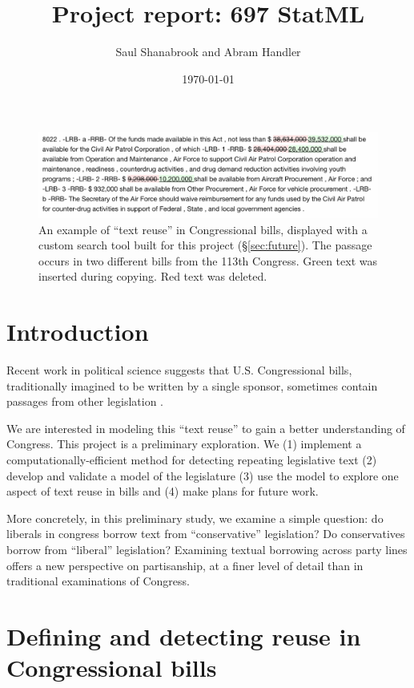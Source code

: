\documentclass{article}
\title{Project report: 697 StatML}
\author{Saul Shanabrook and Abram Handler}
\date{\today}
\begin{document}
\maketitle

\begin{figure}[h]
\begin{mdframed}
\includegraphics[width=13cm]{reuse3.png}
\centering
\caption{An example of ``text reuse'' in Congressional bills, displayed with a custom search tool built for this project (\S\ref{sec:future}). The passage occurs in two different bills from the 113th Congress. Green text was inserted during copying. Red text was deleted.}
\label{fig:example}
\end{mdframed}
\end{figure}

\section{Introduction}

Recent work in political science suggests that U.S. Congressional bills, traditionally imagined to be written by a single sponsor, sometimes contain passages from other legislation \cite{Wilkerson2013TracingTF}.

We are interested in modeling this ``text reuse'' to gain a better understanding of Congress. This project is a preliminary exploration. We (1) implement a computationally-efficient method for detecting repeating legislative text (2) develop and validate a model of the legislature (3) use the model to explore one aspect of text reuse in bills and (4) make plans for future work.

More concretely, in this preliminary study, we examine a simple question: do liberals in congress borrow text from ``conservative'' legislation? Do conservatives borrow from ``liberal'' legislation? Examining textual borrowing across party lines offers a new perspective on partisanship, at a finer level of detail than in traditional examinations of Congress. 


\section{Defining and detecting reuse in Congressional bills}
\end{document}
